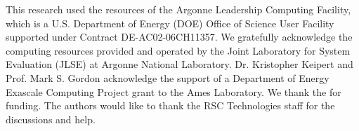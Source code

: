 \begin{acks}
  This research used the resources of the Argonne Leadership Computing Facility, which is a U.S. Department of Energy (DOE) Office of Science User Facility supported under Contract DE-AC02-06CH11357. We gratefully acknowledge the computing resources provided and operated by the Joint Laboratory for System Evaluation (JLSE) at Argonne National Laboratory. Dr. Kristopher Keipert and Prof. Mark S. Gordon acknowledge the support of a Department of Energy Exascale Computing Project grant to the Ames Laboratory. We thank the  for funding. The authors would like to thank the RSC Technologies staff for the discussions and help.

\end{acks}